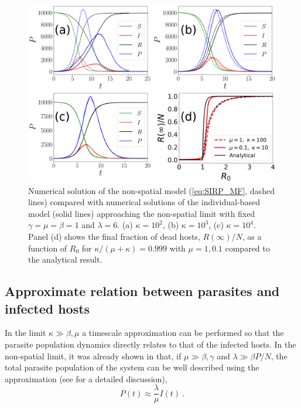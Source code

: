 \begin{figure}[H]
    \centering
    \includegraphics[width=\columnwidth]{Figures/MF_comparison.png}
    \caption[Comparison between the non-spatial model and the individual-based
        model in the high mobility limit]{Numerical solution of the non-spatial
        model (\cref{eq:SIRP_MF}, dashed lines) compared with numerical
        solutions of the individual-based model (solid lines) approaching the
        non-spatial limit with fixed $\gamma=\mu=\beta=1$ and $\lambda=6$. (a)
        $\kappa=10^2$, (b) $\kappa=10^3$, (c) $\kappa=10^4$. Panel (d) shows
        the final fraction of dead hosts, $R(\infty)/N$, as a function of $R_0$
        for $\kappa/(\mu+\kappa)=0.999$ with $\mu=1,0.1$ compared to the
        analytical result.}
    \label{fig:MF_limit}
\end{figure}

\subsection{Approximate relation between parasites and infected hosts}

In the limit $\kappa\gg\beta,\mu$ a timescale approximation can be
performed so that the parasite population dynamics directly relates to that of
the infected hosts. In the non-spatial limit, it was already shown in
\cite{GimenezRomero2021} that, if  $\mu\gg\beta,\gamma$ and $\lambda\gg\beta
    P/N$, the total parasite population of the system can be well described
using the approximation (see \cite{GimenezRomero2021} for a detailed
discussion),
\begin{equation}\label{eq:P_approx_II}
    P(t)\approx \frac{\lambda}{\mu} I(t) \ .
\end{equation}

